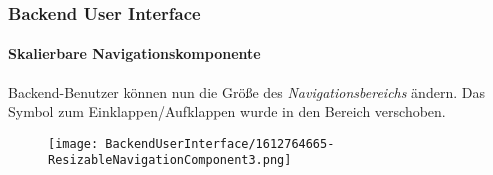 %

\begin{frame}[fragile]
	\frametitle{Backend User Interface}
	\framesubtitle{Skalierbare Navigationskomponente}

	Backend-Benutzer können nun die Größe des \textit{Navigationsbereichs}  
	ändern. Das Symbol zum Einklappen/Aufklappen
	wurde in den Bereich verschoben.

	\begin{figure}
		\texttt{[image: BackendUserInterface/1612764665-ResizableNavigationComponent3.png]}
	\end{figure}

\end{frame}

